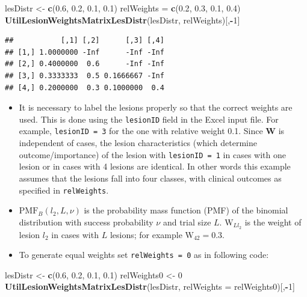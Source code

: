 \documentclass[
]{book}
\newenvironment{Shaded}{\begin{snugshade}}{\end{snugshade}}
\newcommand{\DataTypeTok}[1]{\textcolor[rgb]{0.13,0.29,0.53}{#1}}
\newcommand{\DecValTok}[1]{\textcolor[rgb]{0.00,0.00,0.81}{#1}}
\newcommand{\FloatTok}[1]{\textcolor[rgb]{0.00,0.00,0.81}{#1}}
\newcommand{\KeywordTok}[1]{\textcolor[rgb]{0.13,0.29,0.53}{\textbf{#1}}}
\newcommand{\NormalTok}[1]{#1}
\newcommand{\OperatorTok}[1]{\textcolor[rgb]{0.81,0.36,0.00}{\textbf{#1}}}
\newcommand{\StringTok}[1]{\textcolor[rgb]{0.31,0.60,0.02}{#1}}
\providecommand{\tightlist}{%
  \setlength{\itemsep}{0pt}\setlength{\parskip}{0pt}}
\begin{document}
\begin{Shaded}
\begin{Highlighting}[]
\NormalTok{lesDistr <-}\StringTok{ }\KeywordTok{c}\NormalTok{(}\FloatTok{0.6}\NormalTok{, }\FloatTok{0.2}\NormalTok{, }\FloatTok{0.1}\NormalTok{, }\FloatTok{0.1}\NormalTok{)}
\NormalTok{relWeights =}\StringTok{  }\KeywordTok{c}\NormalTok{(}\FloatTok{0.2}\NormalTok{, }\FloatTok{0.3}\NormalTok{, }\FloatTok{0.1}\NormalTok{, }\FloatTok{0.4}\NormalTok{)}
\KeywordTok{UtilLesionWeightsMatrixLesDistr}\NormalTok{(lesDistr, relWeights)[,}\OperatorTok{-}\DecValTok{1}\NormalTok{]}
\end{Highlighting}
\end{Shaded}

\begin{verbatim}
##           [,1] [,2]      [,3] [,4]
## [1,] 1.0000000 -Inf      -Inf -Inf
## [2,] 0.4000000  0.6      -Inf -Inf
## [3,] 0.3333333  0.5 0.1666667 -Inf
## [4,] 0.2000000  0.3 0.1000000  0.4
\end{verbatim}

\begin{itemize}
\tightlist
\item
  It is necessary to label the lesions properly so that the correct weights are used. This is done using the \texttt{lesionID} field in the Excel input file. For example, \texttt{lesionID\ =\ 3} for the one with relative weight 0.1. Since \(\mathbf{W}\) is independent of cases, the lesion characteristics (which determine outcome/importance) of the lesion with \texttt{lesionID\ =\ 1} in cases with one lesion or in cases with 4 lesions are identical. In other words this example assumes that the lesions fall into four classes, with clinical outcomes as specified in \texttt{relWeights}.
\item
  \(\text{PMF}_{B}\left ( l_2, L, \nu \right )\) is the probability mass function (PMF) of the binomial distribution with success probability \(\nu\) and trial size \(L\). \(\text{W}_{Ll_2}\) is the weight of lesion \(l_2\) in cases with \(L\) lesions; for example \(\text{W}_{42} = 0.3\).
\item
  To generate equal weights set \texttt{relWeights\ =\ 0} as in following code:
\end{itemize}

\begin{Shaded}
\begin{Highlighting}[]
\NormalTok{lesDistr <-}\StringTok{ }\KeywordTok{c}\NormalTok{(}\FloatTok{0.6}\NormalTok{, }\FloatTok{0.2}\NormalTok{, }\FloatTok{0.1}\NormalTok{, }\FloatTok{0.1}\NormalTok{)}
\NormalTok{relWeights0 <-}\StringTok{ }\DecValTok{0}
\KeywordTok{UtilLesionWeightsMatrixLesDistr}\NormalTok{(lesDistr, }\DataTypeTok{relWeights =}\NormalTok{ relWeights0)[,}\OperatorTok{-}\DecValTok{1}\NormalTok{]}
\end{Highlighting}
\end{Shaded}
\end{document}

